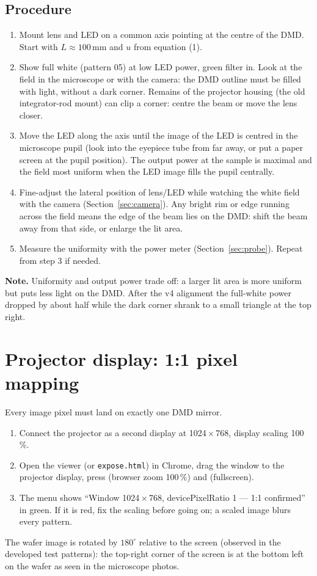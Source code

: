 \documentclass[11pt,a4paper]{article}
\newcommand{\key}[1]{\fbox{\footnotesize\texttt{#1}}}
\newcommand{\file}[1]{\texttt{#1}}
\newcommand{\note}[1]{\par\noindent\colorbox{boxbg}{\parbox{\dimexpr\linewidth-2\fboxsep}{\textbf{Note.} #1}}\par}
\begin{document}
\subsection{Procedure}
\begin{enumerate}
  \item Mount lens and LED on a common axis pointing at the centre of the DMD. Start with $L \approx 100$\,mm and
        $u$ from equation (1).
  \item Show full white (pattern 05) at low LED power, green filter in. Look at the field in the microscope or with
        the camera: the DMD outline must be filled with light, without a dark corner. Remains of the projector
        housing (the old integrator-rod mount) can clip a corner: centre the beam or move the lens closer.
  \item Move the LED along the axis until the image of the LED is centred in the microscope pupil (look into the
        eyepiece tube from far away, or put a paper screen at the pupil position). The output power at the sample is
        maximal and the field most uniform when the LED image fills the pupil centrally.
  \item Fine-adjust the lateral position of lens/LED while watching the white field with the camera
        (Section~\ref{sec:camera}). Any bright rim or edge running across the field means the edge of the beam
        lies on the DMD: shift the beam away from that side, or enlarge the lit area.
  \item Measure the uniformity with the power meter (Section~\ref{sec:probe}). Repeat from step 3 if needed.
\end{enumerate}
\note{Uniformity and output power trade off: a larger lit area is more uniform but puts less light on the DMD. After
the v4 alignment the full-white power dropped by about half while the dark corner shrank to a small triangle at the
top right.}

\section{Projector display: 1:1 pixel mapping}
Every image pixel must land on exactly one DMD mirror.
\begin{enumerate}
  \item Connect the projector as a second display at 1024\,$\times$\,768, display scaling 100\,\%.
  \item Open the viewer (or \file{expose.html}) in Chrome, drag the window to the projector display, press
        \key{Ctrl+0} (browser zoom 100\,\%) and \key{F} (fullscreen).
  \item The menu shows ``Window 1024\,$\times$\,768, devicePixelRatio 1 --- 1:1 confirmed'' in green. If it is red,
        fix the scaling before going on; a scaled image blurs every pattern.
\end{enumerate}
The wafer image is rotated by $180^\circ$ relative to the screen (observed in the developed test patterns): the
top-right corner of the screen is at the bottom left on the wafer as seen in the microscope photos.
\end{document}
